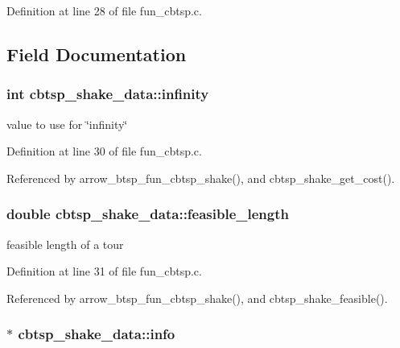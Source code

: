 Definition at line 28 of file fun\_\-cbtsp.c.

\subsection{Field Documentation}
\hypertarget{structcbtsp__shake__data_0027814ba0f0f76f91e7169d0486897f}{
\subsubsection{\setlength{\rightskip}{0pt plus 5cm}int {\bf cbtsp\_\-shake\_\-data::infinity}}}
\label{structcbtsp__shake__data_0027814ba0f0f76f91e7169d0486897f}


value to use for \char`\"{}infinity\char`\"{} 

Definition at line 30 of file fun\_\-cbtsp.c.

Referenced by arrow\_\-btsp\_\-fun\_\-cbtsp\_\-shake(), and cbtsp\_\-shake\_\-get\_\-cost().\hypertarget{structcbtsp__shake__data_651c45c37eee045a6bcea8963955edd6}{
\subsubsection{\setlength{\rightskip}{0pt plus 5cm}double {\bf cbtsp\_\-shake\_\-data::feasible\_\-length}}}
\label{structcbtsp__shake__data_651c45c37eee045a6bcea8963955edd6}


feasible length of a tour 

Definition at line 31 of file fun\_\-cbtsp.c.

Referenced by arrow\_\-btsp\_\-fun\_\-cbtsp\_\-shake(), and cbtsp\_\-shake\_\-feasible().\hypertarget{structcbtsp__shake__data_3d2c2d5951d6245419346509f328720b}{
\subsubsection{$\ast$ {\bf cbtsp\_\-shake\_\-data::info}}}
\label{structcbtsp__shake__data_3d2c2d5951d6245419346509f328720b}


